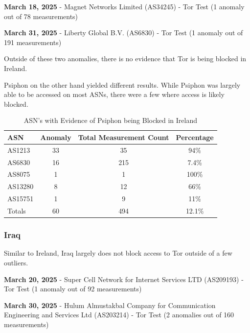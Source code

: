 \textbf{March 18, 2025} - Magnet Networks Limited (AS34245) - Tor Test (1 anomaly out of 78 measurements)

\textbf{March 31, 2025} - Liberty Global B.V. (AS6830) - Tor Test (1 anomaly out of 191 measurements)

Outside of these two anomalies, there is no evidence that Tor is being blocked in Ireland.

Psiphon on the other hand yielded different results. While Psiphon was largely able to be accessed on most ASNs, there were a few where access is likely blocked. 

\begin{table}[H]
\centering
\caption{ASN's with Evidence of Psiphon being Blocked in Ireland}
\begin{tabular}{lccc}
\toprule
\textbf{ASN} & \textbf{Anomaly} & \textbf{Total Measurement Count} & \textbf{Percentage} \\
\midrule
AS1213    & 33 & 35  & 94\% \\
AS6830    & 16 & 215 & 7.4\% \\
AS8075    & 1  & 1   & 100\% \\
AS13280   & 8  & 12  & 66\% \\
AS15751   & 1  & 9   & 11\% \\
\bottomrule
Totals    & 60 & 494 & 12.1\% \\
\end{tabular}
\label{tab:category_block}
\end{table}

\subsubsection{Iraq}

Similar to Ireland, Iraq largely does not block access to Tor outside of a few outliers.

\textbf{March 20, 2025} - Super Cell Network for Internet Services LTD (AS209193) - Tor Test (1 anomaly out of 92 measurements)

\textbf{March 30, 2025} - Hulum Almustakbal Company for Communication Engineering and Services Ltd (AS203214) - Tor Test (2 anomalies out of 160 measurements)

